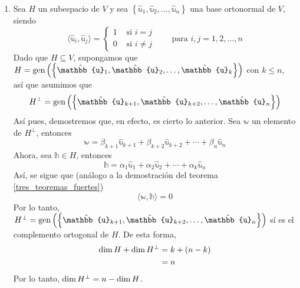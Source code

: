 \begin{theorem}
\begin{enumerate}[label=\roman*)]
        \item Sea $H$ un subespacio de $V$ y sea $\left\{ \hat{\mathbb{u}}_1, \hat{\mathbb{u}}_2, \dots, \hat{\mathbb{u}}_n \right\}$ una base ortonormal de $V$, siendo
        $$\langle \hat{\mathbb{u}}_i, \hat{\mathbb{u}}_j \rangle = \begin{cases}
            1 & \text{ si } i = j \\
            0 & \text{ si } i \neq j
        \end{cases} \qquad \text{para } i, j = 1, 2, \dots, n$$
        Dado que $H \subseteq V$, supongamos que $H = \Gen \left( \left\{ \hat{\mathbb{u}}_1, \hat{\mathbb{u}}_2, \dots, \hat{\mathbb{u}}_k \right\} \right)$ con $k \leq n$, así que asumimos que
        $$H^{\bot} = \Gen \left( \left\{ \hat{\mathbb{u}}_{k+1}, \hat{\mathbb{u}}_{k+2}, \dots, \hat{\mathbb{u}}_n \right\} \right)$$
        Así pues, demostremos que, en efecto, es cierto lo anterior. Sea $\mathbb{w}$ un elemento de $H^{\bot}$, entonces
        $$\mathbb{w} = \beta_{k+1} \hat{\mathbb{u}}_{k+1} + \beta_{k+2} \hat{\mathbb{u}}_{k+2} + \cdots + \beta_n \hat{\mathbb{u}}_n$$
        Ahora, sea $\mathbb{h} \in H$, entonces
        $$\mathbb{h} = \alpha_1 \hat{\mathbb{u}}_1 + \alpha_2 \hat{\mathbb{u}}_2 + \cdots + \alpha_k \hat{\mathbb{u}}_n$$
        Así, se sigue que (análogo a la demostración del teorema \ref{tres_teoremas_fuertes})
        $$\langle \mathbb{w}, \mathbb{h} \rangle = 0$$
        Por lo tanto, $H^{\bot} = \Gen \left( \left\{ \hat{\mathbb{u}}_{k+1}, \hat{\mathbb{u}}_{k+2}, \dots, \hat{\mathbb{u}}_n \right\} \right)$ sí es el complemento ortogonal de $H$. De esta forma,
        \begin{align*}
            \operatorname{dim} H + \operatorname{dim} H^{\bot} & = k + (n - k) \\
            & = n
        \end{align*}
        Por lo tanto, $\operatorname{dim} H^{\bot} = n - \operatorname{dim} H$.
    \end{enumerate}
\end{theorem}

